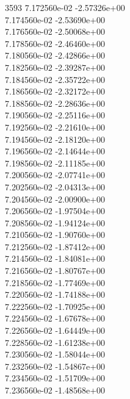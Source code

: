 3593	7.172560e-02	-2.57326e+00	\\ 	7.174560e-02	-2.53690e+00	\\ 	7.176560e-02	-2.50068e+00	\\ 	7.178560e-02	-2.46460e+00	\\ 	7.180560e-02	-2.42866e+00	\\ 	7.182560e-02	-2.39287e+00	\\ 	7.184560e-02	-2.35722e+00	\\ 	7.186560e-02	-2.32172e+00	\\ 	7.188560e-02	-2.28636e+00	\\ 	7.190560e-02	-2.25116e+00	\\ 	7.192560e-02	-2.21610e+00	\\ 	7.194560e-02	-2.18120e+00	\\ 	7.196560e-02	-2.14644e+00	\\ 	7.198560e-02	-2.11185e+00	\\ 	7.200560e-02	-2.07741e+00	\\ 	7.202560e-02	-2.04313e+00	\\ 	7.204560e-02	-2.00900e+00	\\ 	7.206560e-02	-1.97504e+00	\\ 	7.208560e-02	-1.94124e+00	\\ 	7.210560e-02	-1.90760e+00	\\ 	7.212560e-02	-1.87412e+00	\\ 	7.214560e-02	-1.84081e+00	\\ 	7.216560e-02	-1.80767e+00	\\ 	7.218560e-02	-1.77469e+00	\\ 	7.220560e-02	-1.74188e+00	\\ 	7.222560e-02	-1.70925e+00	\\ 	7.224560e-02	-1.67678e+00	\\ 	7.226560e-02	-1.64449e+00	\\ 	7.228560e-02	-1.61238e+00	\\ 	7.230560e-02	-1.58044e+00	\\ 	7.232560e-02	-1.54867e+00	\\ 	7.234560e-02	-1.51709e+00	\\ 	7.236560e-02	-1.48568e+00	\\ \hline
